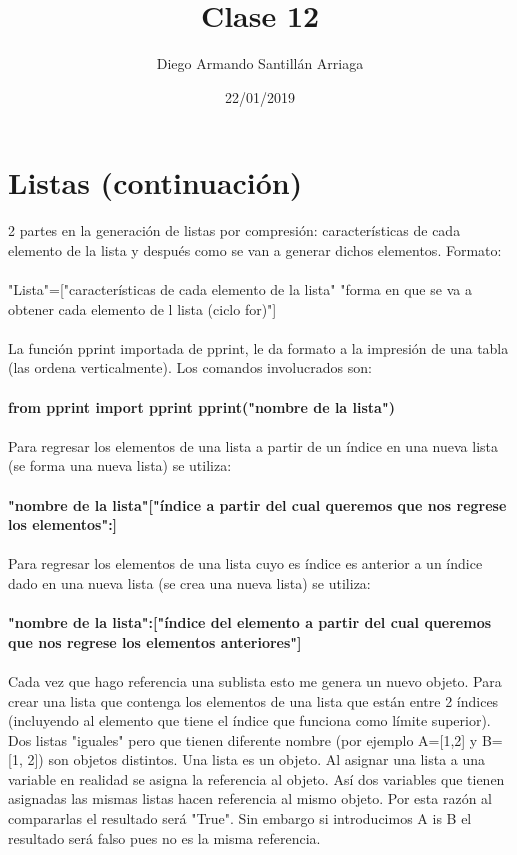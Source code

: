 \documentclass[letter paper, 12pt, oneside]{article}
\title{\Huge Clase 12}
\author{Diego Armando Santillán Arriaga}
\date{22/01/2019}
\begin{document}
	\maketitle	
	\newpage
\section{Listas (continuación)}

2 partes en la generación de listas por compresión: 
características de cada elemento de la lista y después como se van a generar dichos elementos.
Formato:
\\\\
"Lista"=["características de cada elemento de la lista" "forma en que se va a obtener cada elemento de l lista (ciclo for)"]
\\\\
La función pprint importada de pprint, le da formato a la impresión de una tabla (las ordena verticalmente). Los comandos involucrados son:
\\\\
\textbf{from pprint import pprint
pprint("nombre de la lista")}
\\\\
Para regresar los elementos de una lista a partir de un índice en una nueva lista (se forma una nueva lista) se utiliza: 
\\\\
\textbf{"nombre de la lista"["índice a partir del cual queremos que nos regrese los elementos":]}
\\\\
Para regresar los elementos de una lista cuyo es índice es anterior a un índice dado en una nueva lista (se crea una nueva lista) se utiliza: 
\\\\
\textbf{"nombre de la lista":["índice del elemento a partir del cual queremos que nos regrese los elementos anteriores"]}
\\\\
Cada vez que hago referencia una sublista esto me genera un nuevo objeto.
Para crear una lista que contenga los elementos de una lista que están entre 2 índices (incluyendo al elemento que tiene el índice que funciona como límite superior).
Dos listas "iguales" pero que tienen diferente nombre (por ejemplo A=[1,2] y B=[1, 2]) son objetos distintos.
Una lista es un objeto. Al asignar una lista a una variable en realidad se asigna la referencia al objeto. Así dos variables que tienen asignadas las mismas listas hacen referencia al mismo objeto. Por esta razón al compararlas el resultado será "True". Sin embargo si introducimos A is B el resultado será falso pues no es la misma referencia. 
\end{document}
